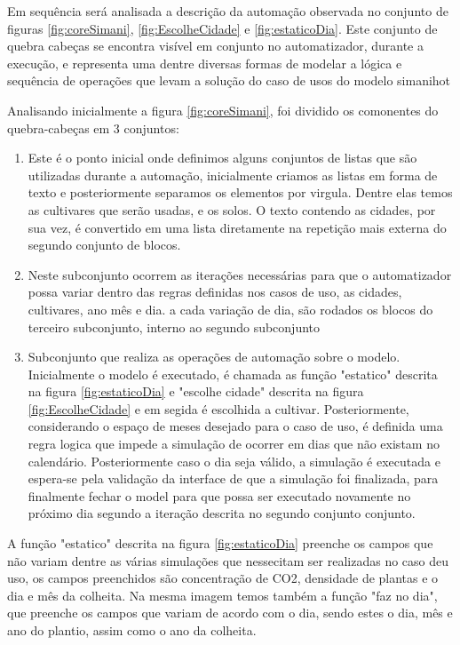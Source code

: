 \documentclass[tg]{mdtufsm}
\begin{document}
                    Em sequência será analisada a descrição da automação observada no conjunto de figuras \ref{fig:coreSimani}, \ref{fig:EscolheCidade} e \ref{fig:estaticoDia}. Este conjunto de quebra cabeças se encontra visível em conjunto no automatizador, durante a execução, e representa uma dentre diversas formas de modelar a lógica e sequência de operações que levam a solução do caso de usos do modelo simanihot

                    Analisando inicialmente a figura \ref{fig:coreSimani}, foi dividido os comonentes do quebra-cabeças em 3 conjuntos:

                    \begin{enumerate}[label*=\arabic*.]
                        \item Este é o ponto inicial onde definimos alguns conjuntos de listas que são utilizadas durante a automação, inicialmente criamos as listas em forma de texto e posteriormente separamos os elementos por virgula. Dentre elas temos as cultivares que serão usadas, e os solos. O texto contendo as cidades, por sua vez, é convertido em uma lista diretamente na repetição mais externa do segundo conjunto de blocos.
                        \item Neste subconjunto ocorrem as iterações necessárias para que o automatizador possa variar dentro das regras definidas nos casos de uso, as cidades, cultivares, ano mês e dia. a cada variação de dia, são rodados os blocos do terceiro subconjunto, interno ao segundo subconjunto
                        \item Subconjunto que realiza as operações de automação sobre o modelo. Inicialmente o modelo é executado, é chamada as função "estatico" descrita na figura \ref{fig:estaticoDia} e "escolhe cidade" descrita na figura \ref{fig:EscolheCidade} e em segida é escolhida a cultivar. Posteriormente, considerando o espaço de meses desejado para o caso de uso, é definida uma regra logica que impede a simulação de ocorrer em dias que não existam no calendário. Posteriormente caso o dia seja válido, a simulação é executada e espera-se pela validação da interface de que a simulação foi finalizada, para finalmente fechar o model para que possa ser executado novamente no próximo dia segundo a iteração descrita no segundo conjunto conjunto.
                    \end{enumerate}

                    A função "estatico" descrita na figura \ref{fig:estaticoDia} preenche os campos que não variam dentre as várias simulações que nessecitam ser realizadas no caso deu uso, os campos preenchidos são concentração de CO2, densidade de plantas e o dia e mês da colheita. Na mesma imagem temos também a função "faz no dia", que preenche os campos que variam de acordo com o dia, sendo estes o dia, mês e ano do plantio, assim como o ano da colheita.
\end{document}
